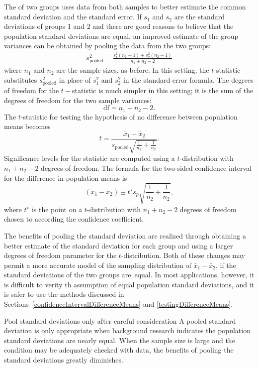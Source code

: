 The  of two groups uses data from both samples to better estimate the common standard deviation and the standard error. If $s_1^{}$ and $s_2^{}$ are the standard deviations of groups 1 and 2 and there are good reasons to believe that the population standard deviations are equal, an improved estimate of the group variances can be obtained by pooling the data from the two groups:
\begin{align*}
s_{\text{pooled}}^2 = \frac{s_1^2 (n_1-1) + s_2^2 (n_2-1)}{n_1 + n_2 - 2}
\end{align*}
where $n_1$ and $n_2$ are the sample sizes, as before. In this setting, the $t$-statistic substitutes $s_{\text{pooled}}^2$ in place of $s_1^2$ and $s_2^2$ in the standard error formula. The degrees of freedom for the $t-$statistic is much simpler in this setting; it is the sum of the degrees of freedom for the two sample variances:
\[
\text{df} = n_1 + n_2 - 2.
\]
The $t$-statistic for testing the hypothesis of no difference between population means becomes 
\[
 t = \frac{\overline{x}_1 - \overline{x}_2}{s_{\text{pooled}}\sqrt{\frac{1}{n_2} + \frac{1}{n_2}}}. 
\]
Significance levels for the statistic are computed using a $t$-distribution with $n_1 + n_2 - 2$ degrees of freedom. The formula for the two-sided confidence interval for the difference in population means is
\[
(\overline{x}_1 - \overline{x}_2) \pm t^{\star} s_p \sqrt{\frac{1}{n_2} + \frac{1}{n_2}},
\]
where $t^{\star}$ is the point on a $t$-distribution with $n_1 + n_2 -2$ degrees of freedom chosen to according the confidence coefficient.

The benefits of pooling the standard deviation are realized through obtaining a better estimate of the standard deviation for each group and using a larger degrees of freedom parameter for the $t$-distribution. Both of these changes may permit a more accurate model of the sampling distribution of $\bar{x}_1 - \bar{x}_2$, if the standard deviations of the two groups are~equal.  In most applications, however, it is difficult to verity th assumption of equal population standard deviations, and it is safer to use the methods discussed in Sections~\ref{confidenceIntervalDifferenceMeans} and \ref{testingDifferenceMeans}.

\begin{caution}
{Pool standard deviations only after careful consideration}
{A pooled standard deviation is only appropriate when background research indicates the population standard deviations are nearly equal. When the sample size is large and the condition may be adequately checked with data, the benefits of pooling the standard deviations greatly diminishes.}
\end{caution}


